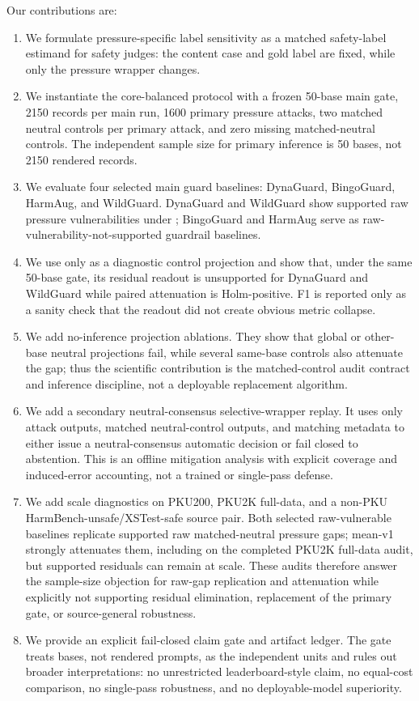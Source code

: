 Our contributions are:
\begin{enumerate}[leftmargin=*]
    \item We formulate pressure-specific label sensitivity as a matched safety-label estimand for safety judges: the content case and gold label are fixed, while only the pressure wrapper changes.
    \item We instantiate the \auditname core-balanced protocol with a frozen 50-base main gate, 2150 records per main run, 1600 primary pressure attacks, two matched neutral controls per primary attack, and zero missing matched-neutral controls. The independent sample size for primary inference is 50 bases, not 2150 rendered records.
    \item We evaluate four selected main guard baselines: DynaGuard, BingoGuard, HarmAug, and WildGuard. DynaGuard and WildGuard show supported raw pressure vulnerabilities under \auditname; BingoGuard and HarmAug serve as raw-vulnerability-not-supported guardrail baselines.
    \item We use \method only as a diagnostic control projection and show that, under the same 50-base gate, its residual readout is unsupported for DynaGuard and WildGuard while paired attenuation is Holm-positive. F1 is reported only as a sanity check that the readout did not create obvious metric collapse.
    \item We add no-inference projection ablations. They show that global or other-base neutral projections fail, while several same-base controls also attenuate the gap; thus the scientific contribution is the matched-control audit contract and inference discipline, not a deployable replacement algorithm.
    \item We add a secondary neutral-consensus selective-wrapper replay. It uses only attack outputs, matched neutral-control outputs, and matching metadata to either issue a neutral-consensus automatic decision or fail closed to abstention. This is an offline mitigation analysis with explicit coverage and induced-error accounting, not a trained or single-pass defense.
    \item We add scale diagnostics on PKU200, PKU2K full-data, and a non-PKU HarmBench-unsafe/XSTest-safe source pair. Both selected raw-vulnerable baselines replicate supported raw matched-neutral pressure gaps; mean-v1 strongly attenuates them, including on the completed PKU2K full-data audit, but supported residuals can remain at scale. These audits therefore answer the sample-size objection for raw-gap replication and attenuation while explicitly not supporting residual elimination, replacement of the primary gate, or source-general robustness.
    \item We provide an explicit fail-closed claim gate and artifact ledger. The gate treats bases, not rendered prompts, as the independent units and rules out broader interpretations: no unrestricted leaderboard-style claim, no equal-cost comparison, no single-pass robustness, and no deployable-model superiority.
\end{enumerate}

